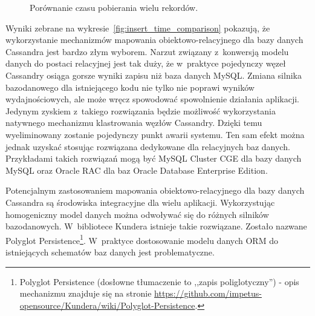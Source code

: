 \begin{figure}
	\centering

	\caption{Porównanie czasu pobierania wielu rekordów.}
	\label{fig:select_time_comparison}
\end{figure}

Wyniki zebrane na wykresie~\ref{fig:insert_time_comparison} pokazują, że wykorzystanie mechanizmów mapowania obiektowo-relacyjnego dla bazy danych Cassandra jest bardzo złym wyborem. Narzut związany z~konwersją modelu danych do postaci relacyjnej jest tak duży, że w~praktyce pojedynczy węzeł Cassandry osiąga gorsze wyniki zapisu niż baza danych MySQL. Zmiana silnika bazodanowego dla istniejącego kodu nie tylko nie poprawi wyników wydajnościowych, ale może wręcz spowodować spowolnienie działania aplikacji. Jedynym zyskiem z~takiego rozwiązania będzie możliwość wykorzystania natywnego mechanizmu klastrowania węzłów Cassandry. Dzięki temu wyeliminowany zostanie pojedynczy punkt awarii systemu. Ten sam efekt można jednak uzyskać stosując rozwiązana dedykowane dla relacyjnych baz danych. Przykładami takich rozwiązań mogą być MySQL Cluster CGE dla bazy danych MySQL oraz Oracle RAC dla baz Oracle Database Enterprise Edition.

Potencjalnym zastosowaniem mapowania obiektowo-relacyjnego dla bazy danych Cassandra są środowiska integracyjne dla wielu aplikacji. Wykorzystując homogeniczny model danych można odwoływać się do różnych silników bazodanowych. W~bibliotece Kundera istnieje takie rozwiązane. Zostało nazwane Polyglot Persistence\footnote{Polyglot Persistence (dosłowne tłumaczenie to ,,zapis poliglotyczny'') - opis mechanizmu znajduje się na stronie \url{https://github.com/impetus-opensource/Kundera/wiki/Polyglot-Persistence}.}. W~praktyce dostosowanie modelu danych ORM do istniejących schematów baz danych jest problematyczne.  

